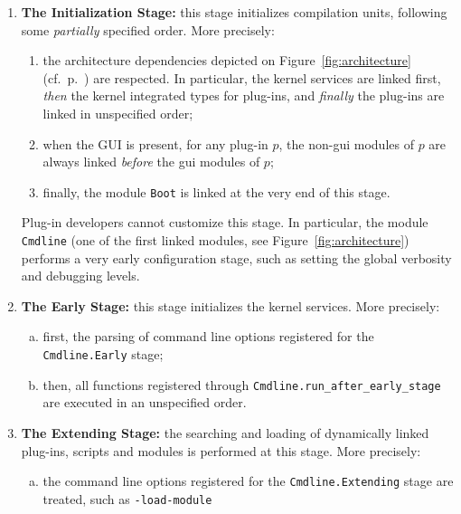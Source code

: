 \begin{enumerate}[A --]

\item \textbf{The Initialization Stage:} this stage
  initializes \framac compilation units, following some \emph{partially}
  specified order. More precisely:
  \begin{enumerate}[1.]
  \item the architecture dependencies depicted on
    Figure~\ref{fig:architecture} (cf.~p.~\pageref{archi:general}) are
    respected. In particular, the kernel services are linked first,
    \emph{then} the kernel integrated types for plug-ins, and
    \emph{finally} the plug-ins are linked in unspecified order;
  \item when the GUI is present, for any plug-in
    $p$, the non-gui modules of $p$ are always linked \emph{before}
    the gui modules of $p$;
  \item finally, the module \texttt{Boot} is linked at the
    very end of this stage.
  \end{enumerate}

  Plug-in developers cannot customize this stage. In particular, the module
  \texttt{Cmdline} (one of the first linked modules, see
  Figure~\ref{fig:architecture}) performs a very early configuration stage,
  such as setting the global verbosity and debugging levels.

\item \label{stage:early} \textbf{The Early Stage:} this stage initializes the
  kernel services. More precisely:
  \begin{enumerate}[(a)]
  \item first, the parsing of command line options registered for the
    \texttt{Cmdline.Early} stage;
  \item then, all functions registered through
    \texttt{Cmdline.run\_after\_early\_stage}%
     are executed in an
    unspecified order.
  \end{enumerate}

\item \label{stage:extending} \textbf{The Extending Stage:} the searching and
  loading of dynamically linked plug-ins, scripts and
  modules is performed at this stage. More precisely:

  \begin{enumerate}[(a)]
  \item the command line options registered for the
    \texttt{Cmdline.Extending} stage
    are treated, such as \texttt{-load-module}


\end{enumerate}
\end{enumerate}
